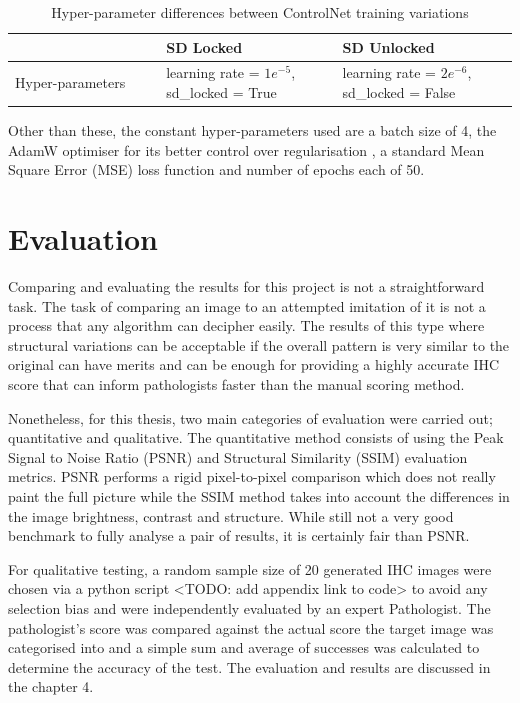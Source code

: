 \begin{table}[H]
\begin{center}
\begin{tabular}{|>{\raggedright\arraybackslash}p{0.3\linewidth}|>{\raggedright\arraybackslash}p{0.35\linewidth}|>{\raggedright\arraybackslash}p{0.35\linewidth}|}
\hline 
\textbf{}& \textbf{SD Locked}& \textbf{SD Unlocked}\\ \hline 
Hyper-parameters& learning rate = $1e^{-5}$, sd\_locked = True& learning rate = $2e^{-6}$, sd\_locked = False\\ \hline
\end{tabular}
\caption[Hyper-parameter differences between ControlNet training variations]{Hyper-parameter differences between ControlNet training variations}\label{tab:training-variation}
\end{center}
\end{table}
Other than these, the constant hyper-parameters used are a batch size of 4, the AdamW optimiser for its better control over regularisation \parencite{Loshchilov2017DecoupledRegularization}, a standard Mean Square Error (MSE) loss function and number of epochs each of 50. 

\section{Evaluation}

Comparing and evaluating the results for this project is not a straightforward task. The task of comparing an image to an attempted imitation of it is not a process that any algorithm can decipher easily. The results of this type where structural variations can be acceptable if the overall pattern is very similar to the original can have merits and can be enough for providing a highly accurate IHC score that can inform pathologists faster than the manual scoring method. 

Nonetheless, for this thesis, two main categories of evaluation were carried out; quantitative and qualitative. The quantitative method consists of using the Peak Signal to Noise Ratio (PSNR) and Structural Similarity (SSIM) evaluation metrics. PSNR performs a rigid pixel-to-pixel comparison which does not really paint the full picture while the SSIM method takes into account the differences in the image brightness, contrast and structure. While still not a very good benchmark to fully analyse a pair of results, it is certainly fair than PSNR.

For qualitative testing, a random sample size of 20 generated IHC images were chosen via a python script <TODO: add appendix link to code> to avoid any selection bias and were independently evaluated by an expert Pathologist. The pathologist's score was compared against the actual score the target image was categorised into and a simple sum and average of successes was calculated to determine the accuracy of the test. The evaluation and results are discussed in the chapter 4.

